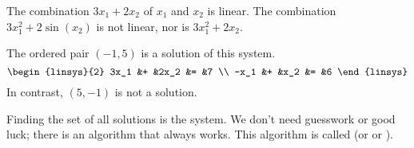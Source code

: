 \begin{example}
The combination \( 3x_1 + 2x_2 \) of $x_1$ and $x_2$ is linear.
The combination \( 3x_1^2 + 2\sin(x_2) \) is not linear, nor is
\( 3x_1^2 + 2x_2 \).  
\end{example}

\begin{example}
The ordered pair \( (-1,5) \) is a solution of this system.
\begin{equation*}
  \begin{linsys}{2}
    3x_1 &+ &2x_2 &= &7  \\
    -x_1 &+ &x_2  &= &6
  \end{linsys}
\end{equation*}
In contrast, \( (5,-1) \) is not a solution.
\end{example}

Finding the set of all solutions is 
the system.
We don't need 
guesswork or good luck; 
there is an algorithm that always works.
This algorithm is called 
%
(or %
or %
%
%
).

